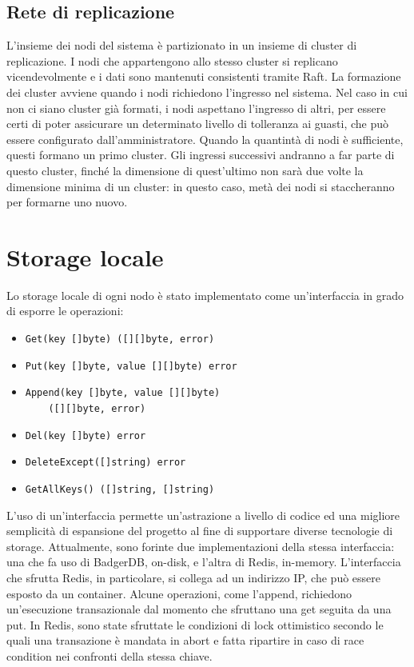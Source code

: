 \documentclass[conference]{IEEEtran}
\begin{document}
\subsection{Rete di replicazione}
L'insieme dei nodi del sistema è partizionato in un insieme di cluster di replicazione. I nodi che appartengono allo
stesso cluster si replicano vicendevolmente e i dati sono mantenuti consistenti tramite Raft. La formazione dei cluster
avviene quando i nodi richiedono l'ingresso nel sistema. Nel caso in cui non ci siano cluster già formati, i nodi aspettano
l'ingresso di altri, per essere certi di poter assicurare un determinato livello di tolleranza ai guasti, che può essere
configurato dall'amministratore. Quando la quantintà di nodi è sufficiente, questi formano un primo cluster. Gli ingressi successivi
andranno a far parte di questo cluster, finché la dimensione di quest'ultimo non sarà due volte la dimensione minima di un
cluster: in questo caso, metà dei nodi si staccheranno per formarne uno nuovo.

\section{Storage locale}
Lo storage locale di ogni nodo è stato implementato come un'interfaccia in grado di esporre le operazioni:
\begin{itemize}
  \item {\small{\verb!Get(key []byte) ([][]byte, error)!}}
  \item {\small{\verb!Put(key []byte, value [][]byte) error!}}
  \item {\small{\verb!Append(key []byte, value [][]byte)!\\ \verb!    ([][]byte, error)!}}
  \item {\small{\verb!Del(key []byte) error!}}
  \item {\small{\verb!DeleteExcept([]string) error!}}
  \item {\small{\verb!GetAllKeys() ([]string, []string)!}}
\end{itemize}
L'uso di un'interfaccia permette un'astrazione a livello di codice ed una migliore semplicità di espansione del progetto
al fine di supportare diverse tecnologie di storage. Attualmente, sono forinte due implementazioni della stessa interfaccia:
una che fa uso di BadgerDB, on-disk, e l'altra di Redis, in-memory. L'interfaccia che sfrutta Redis, in particolare, si collega ad un indirizzo
IP, che può essere esposto da un container. Alcune operazioni, come l'append, richiedono un'esecuzione transazionale dal
momento che sfruttano una get seguita da una put. In Redis, sono state sfruttate le condizioni di lock ottimistico secondo
le quali una transazione è mandata in abort e fatta ripartire in caso di race condition nei confronti della stessa chiave.
\end{document}
